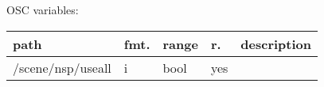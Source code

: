 \begin{snugshade}
{\footnotesize
\label{osctab:receivermodnsp}
OSC variables:
\nopagebreak

\begin{tabularx}{\textwidth}{llllX}
\hline
path & fmt. & range & r. & description\\
\hline
/scene/nsp/useall & i & bool & yes & \\
\hline
\end{tabularx}
}
\end{snugshade}
